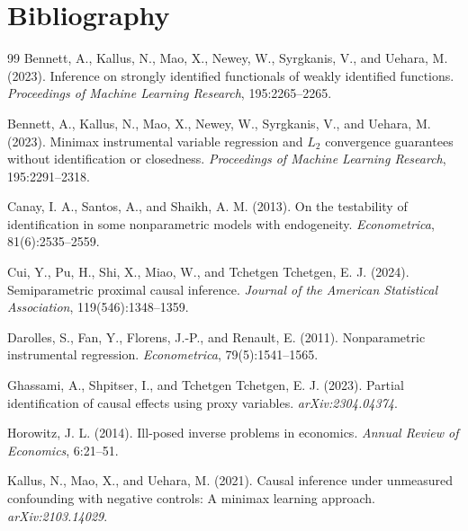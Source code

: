 \documentclass[11pt]{article}
\theoremstyle{definition}
\theoremstyle{plain}
\theoremstyle{remark}
\begin{document}
\section*{Bibliography}
\begin{thebibliography}{99}
Bennett, A., Kallus, N., Mao, X., Newey, W., Syrgkanis, V., and Uehara, M.
(2023).
\newblock Inference on strongly identified functionals of weakly identified
functions.
\newblock \emph{Proceedings of Machine Learning Research}, 195:2265--2265.

Bennett, A., Kallus, N., Mao, X., Newey, W., Syrgkanis, V., and Uehara, M.
(2023).
\newblock Minimax instrumental variable regression and \(L_2\) convergence
guarantees without identification or closedness.
\newblock \emph{Proceedings of Machine Learning Research}, 195:2291--2318.

Canay, I. A., Santos, A., and Shaikh, A. M. (2013).
\newblock On the testability of identification in some nonparametric models
with endogeneity.
\newblock \emph{Econometrica}, 81(6):2535--2559.

Cui, Y., Pu, H., Shi, X., Miao, W., and Tchetgen Tchetgen, E. J. (2024).
\newblock Semiparametric proximal causal inference.
\newblock \emph{Journal of the American Statistical Association},
119(546):1348--1359.

Darolles, S., Fan, Y., Florens, J.-P., and Renault, E. (2011).
\newblock Nonparametric instrumental regression.
\newblock \emph{Econometrica}, 79(5):1541--1565.

Ghassami, A., Shpitser, I., and Tchetgen Tchetgen, E. J. (2023).
\newblock Partial identification of causal effects using proxy variables.
\newblock \emph{arXiv:2304.04374}.

Horowitz, J. L. (2014).
\newblock Ill-posed inverse problems in economics.
\newblock \emph{Annual Review of Economics}, 6:21--51.

Kallus, N., Mao, X., and Uehara, M. (2021).
\newblock Causal inference under unmeasured confounding with negative
controls: A minimax learning approach.
\newblock \emph{arXiv:2103.14029}.


\end{thebibliography}
\end{document}
